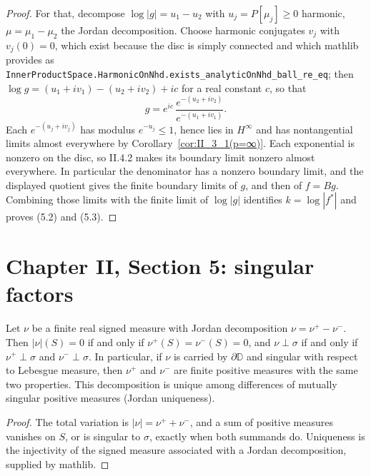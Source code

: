 \begin{theorem}
\begin{proof}
    For that, decompose $\log|g|=u_1-u_2$ with $u_j=P[\mu_j]\ge0$ harmonic,
    $\mu=\mu_1-\mu_2$ the Jordan decomposition. Choose harmonic conjugates
    $v_j$ with $v_j(0)=0$, which exist because the disc is simply connected and
    which mathlib provides as
    \texttt{InnerProductSpace.HarmonicOnNhd.exists\_analyticOnNhd\_ball\_re\_eq};
    then $\log g=(u_1+iv_1)-(u_2+iv_2)+ic$ for a real constant $c$, so that
    \[
      g=e^{ic}\,\frac{e^{-(u_2+iv_2)}}{e^{-(u_1+iv_1)}} .
    \]
    Each $e^{-(u_j+iv_j)}$ has modulus $e^{-u_j}\le1$, hence lies in
    $H^\infty$ and has nontangential limits almost everywhere by
    Corollary~\ref{cor:II_3_1(p=∞)}. Each exponential is nonzero on the disc, so II.4.2
    makes its boundary limit nonzero almost everywhere. In particular the
    denominator has a nonzero boundary limit, and the displayed quotient
    gives the finite boundary limits of $g$, and then of $f=Bg$.
    Combining those limits with the finite limit of $\log|g|$ identifies
    $k=\log|f^*|$ and proves (5.2) and (5.3).
  \end{proof}
\end{theorem}

\section{Chapter II, Section 5: singular factors}

\begin{theorem}
  \label{thm:jordan_decomposition_singular_measure}
  \leanok
  Let $\nu$ be a finite real signed measure with Jordan decomposition
  $\nu=\nu^+-\nu^-$. Then $|\nu|(S)=0$ if and only if $\nu^+(S)=\nu^-(S)=0$,
  and $\nu\perp\sigma$ if and only if $\nu^+\perp\sigma$ and $\nu^-\perp\sigma$.
  In particular, if $\nu$ is carried by $\partial\mathbb{D}$ and singular with
  respect to Lebesgue measure, then $\nu^+$ and $\nu^-$ are finite positive
  measures with the same two properties. This decomposition is unique
  among differences of mutually singular positive measures (Jordan uniqueness).
  \begin{proof}
    \leanok
    The total variation is $|\nu|=\nu^++\nu^-$, and a sum of positive measures
    vanishes on $S$, or is singular to $\sigma$, exactly when both summands do.
    Uniqueness is the injectivity of the signed measure associated with a
    Jordan decomposition, supplied by mathlib.
  \end{proof}
\end{theorem}

